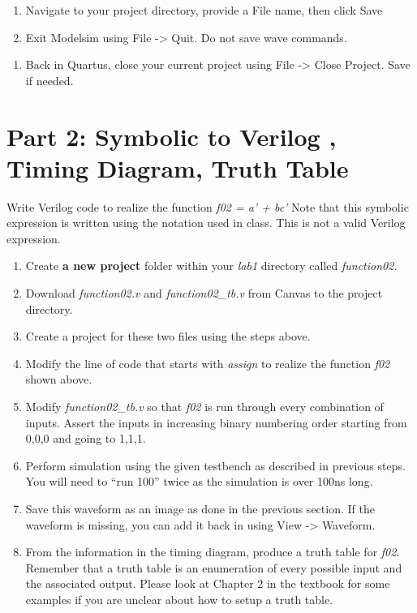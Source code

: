 \begin{enumerate}
\def\labelenumi{\alph{enumi}.}
\setcounter{enumi}{4}
\item
  Navigate to your project directory, provide a File name, then click
  Save
\item
  Exit Modelsim using File -\textgreater{} Quit. Do not save wave
  commands.
\end{enumerate}

\begin{enumerate}
\def\labelenumi{\arabic{enumi}.}
\setcounter{enumi}{23}
\item
  Back in Quartus, close your current project using File -\textgreater{}
  Close Project. Save if needed.
\end{enumerate}

\hypertarget{part-2-symbolic-to-verilog-timing-diagram-truth-table.}{%
\section{Part 2: Symbolic to Verilog , Timing Diagram, Truth Table}
\label{part-2-symbolic-to-verilog-timing-diagram-truth-table.}}

Write Verilog code to realize the function \emph{f02 = a' + bc'} Note
that this symbolic expression is written using the notation used in
class. This is not a valid Verilog expression.

\begin{enumerate}
\def\labelenumi{\arabic{enumi}.}
\item
  Create \textbf{a new project} folder within your \emph{lab1} directory
  called \emph{function02.}
\item
  Download \emph{function02.v} and \emph{function02\_tb.v} from Canvas
  to the project directory.
\item
  Create a project for these two files using the steps above.
\item
  \protect\hypertarget{Part_2_Step_4}{}{}Modify the line of code that
  starts with \emph{assign} to realize the function \emph{f02} shown
  above.
\item
  Modify \emph{function02\_tb.v} so that \emph{f02} is run through every
  combination of inputs. Assert the inputs in increasing binary
  numbering order starting from 0,0,0 and going to 1,1,1.
\item
  Perform simulation using the given testbench as described in previous
  steps. You will need to ``run 100'' twice as the simulation is over
  100ns long.
\item
  \protect\hypertarget{Part_2_Step_7}{}{}Save this waveform as an image
  as done in the previous section. If the waveform is missing, you can
  add it back in using View -\textgreater{} Waveform.
\item
  \protect\hypertarget{Part_2_Step_8}{}{}From the information in the
  timing diagram, produce a truth table for \emph{f02}. Remember that a
  truth table is an enumeration of every possible input and the
  associated output. Please look at Chapter 2 in the textbook for some
  examples if you are unclear about how to setup a truth table.
\end{enumerate}


